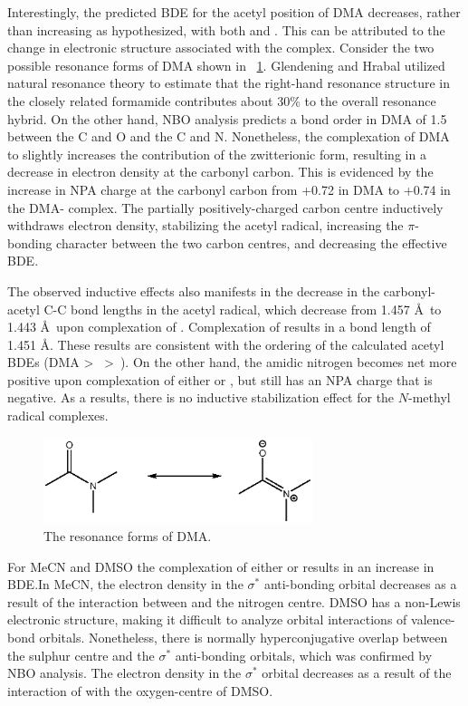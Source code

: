 \begin{doublespace}
Interestingly, the predicted BDE for the acetyl position of DMA decreases,
rather than increasing as hypothesized, with both  and . This
can be attributed to the change in electronic structure associated with the
complex. Consider the two possible resonance forms of DMA shown in
~\ref{fig:dma-res}. Glendening and Hrabal\cite{Hrabal1997} utilized natural
resonance theory to estimate that the right-hand resonance structure in the
closely related formamide contributes about 30\% to the overall resonance
hybrid. On the other hand, NBO analysis predicts a bond order in DMA of 1.5
between the C and O and the C and N. Nonetheless, the complexation of DMA to
 slightly increases the contribution of the zwitterionic form,
resulting in a decrease in electron density at the carbonyl carbon. This is
evidenced by the increase in NPA charge at the carbonyl carbon from +0.72 in DMA
to +0.74 in the DMA- complex. The partially positively-charged carbon
centre inductively withdraws electron density, stabilizing the acetyl radical,
increasing the $\pi$-bonding character between the two carbon centres, and
decreasing the effective BDE.

The observed inductive effects also manifests in the decrease in the
carbonyl-acetyl C-C bond lengths in the acetyl radical, which decrease from
1.457 \AA\ to 1.443 \AA\ upon complexation of . Complexation of
 results in a bond length of 1.451 \AA. These results are consistent
with the ordering of the calculated acetyl BDEs (DMA \textgreater\ 
\textgreater\ ). On the other hand, the amidic nitrogen becomes net
more positive upon complexation of either  or , but still has
an NPA charge that is negative. As a results, there is no inductive
stabilization effect for the $N$-methyl radical complexes.

\begin{figure}[!htpb]
  \centering
  \includegraphics[width=0.7\textwidth]{figures/DMA-resonance.eps}
  \caption{The resonance forms of DMA.}
  \label{fig:dma-res}
\end{figure}

For MeCN and DMSO the complexation of either  or  results in
an increase in  BDE.\@ In MeCN, the electron density in the 
$\sigma^*$ anti-bonding orbital decreases as a result of the interaction between
 and the nitrogen centre. DMSO has a non-Lewis electronic structure,
making it difficult to analyze orbital interactions of valence-bond orbitals.
Nonetheless, there is normally hyperconjugative overlap between the sulphur
centre and the  $\sigma^*$ anti-bonding orbitals, which was confirmed by
NBO analysis. The electron density in the  $\sigma^*$ orbital decreases
as a result of the interaction of  with the oxygen-centre of DMSO.


\end{doublespace}
